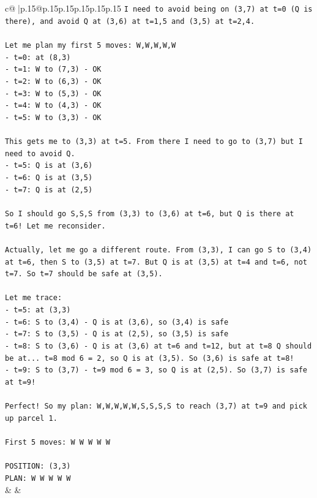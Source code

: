 \documentclass{article}
\begin{document}
{\begin{supertabular}{c@{$\;$}|p{.15\linewidth}@{}p{.15\linewidth}p{.15\linewidth}p{.15\linewidth}p{.15\linewidth}p{.15\linewidth}}
{{{\texttt{I need to avoid being on (3,7) at t=0 (Q is there), and avoid Q at (3,6) at t=1,5 and (3,5) at t=2,4.} \\
\\ 
\texttt{Let me plan my first 5 moves: W,W,W,W,W} \\
\texttt{{-} t=0: at (8,3)} \\
\texttt{{-} t=1: W to (7,3) {-} OK} \\
\texttt{{-} t=2: W to (6,3) {-} OK} \\
\texttt{{-} t=3: W to (5,3) {-} OK} \\
\texttt{{-} t=4: W to (4,3) {-} OK} \\
\texttt{{-} t=5: W to (3,3) {-} OK} \\
\\ 
\texttt{This gets me to (3,3) at t=5. From there I need to go to (3,7) but I need to avoid Q.} \\
\texttt{{-} t=5: Q is at (3,6)} \\
\texttt{{-} t=6: Q is at (3,5)} \\
\texttt{{-} t=7: Q is at (2,5)} \\
\\ 
\texttt{So I should go S,S,S from (3,3) to (3,6) at t=6, but Q is there at t=6! Let me reconsider.} \\
\\ 
\texttt{Actually, let me go a different route. From (3,3), I can go S to (3,4) at t=6, then S to (3,5) at t=7. But Q is at (3,5) at t=4 and t=6, not t=7. So t=7 should be safe at (3,5).} \\
\\ 
\texttt{Let me trace:} \\
\texttt{{-} t=5: at (3,3)} \\
\texttt{{-} t=6: S to (3,4) {-} Q is at (3,6), so (3,4) is safe} \\
\texttt{{-} t=7: S to (3,5) {-} Q is at (2,5), so (3,5) is safe} \\
\texttt{{-} t=8: S to (3,6) {-} Q is at (3,6) at t=6 and t=12, but at t=8 Q should be at... t=8 mod 6 = 2, so Q is at (3,5). So (3,6) is safe at t=8!} \\
\texttt{{-} t=9: S to (3,7) {-} t=9 mod 6 = 3, so Q is at (2,5). So (3,7) is safe at t=9!} \\
\\ 
\texttt{Perfect! So my plan: W,W,W,W,W,S,S,S,S to reach (3,7) at t=9 and pick up parcel 1.} \\
\\ 
\texttt{First 5 moves: W W W W W} \\
\\ 
\texttt{POSITION: (3,3)} \\
\texttt{PLAN: W W W W W} \\
            }
        }
    }
    & & \\ \\


\end{supertabular}}
\end{document}
